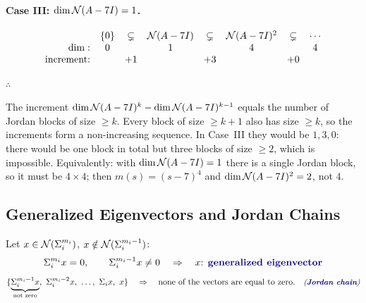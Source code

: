 \begin{example}
\paragraph{Case III: $\dim\mathcal{N}(A-7I)=1$.}
\[
\begin{array}{r@{\quad}ccccccc}
 & \{0\} & \subsetneq & \Null(A-7I) & \subsetneq & \Null(A-7I)^2 & \subsetneq & \cdots\\
\dim: & 0 & & 1 & & 4 & & 4\\
\text{increment:} & & +1 & & +3 & & +0 &
\end{array}
\]

$\therefore$ 

\begin{insight}
The increment $\dim\mathcal{N}(A-7I)^{k}-\dim\mathcal{N}(A-7I)^{k-1}$ equals the number of Jordan blocks of size $\geq k$. Every block of size $\geq k+1$ also has size $\geq k$, so the increments form a non-increasing sequence. In Case~III they would be $1,3,0$: there would be one block in total but three blocks of size $\geq2$, which is impossible. Equivalently: with $\dim\mathcal{N}(A-7I)=1$ there is a single Jordan block, so it must be $4\times4$; then $m(s)=(s-7)^4$ and $\dim\mathcal{N}(A-7I)^2=2$, not $4$.
\end{insight}
\end{example}

\subsection{Generalized Eigenvectors and Jordan Chains}\label{ss:chains}
Let $x\in\mathcal{N}(\Sigma_i^{m_i})$, $x\notin\mathcal{N}(\Sigma_i^{m_i-1})$:
\[
\Sigma_i^{m_i}x=0, \qquad \Sigma_i^{m_i-1}x\neq 0 \quad\Rightarrow\quad x\text{: \term{generalized eigenvector}}
\]
\[
\{\underbrace{\Sigma_i^{m_i-1}x}_{\text{not zero}},\ \Sigma_i^{m_i-2}x,\ \dots,\ \Sigma_i x,\ x\}
\quad\Rightarrow\quad \text{none of the vectors are equal to zero.}\sidenote{\term{Jordan chain}}
\]

